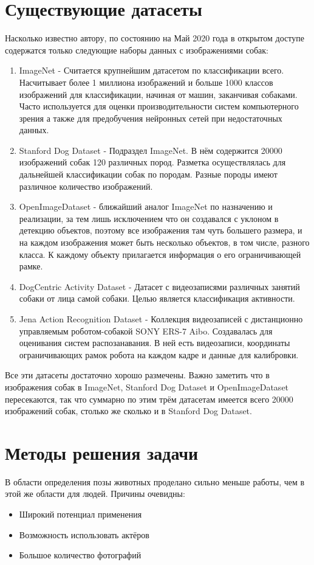 \section{Существующие датасеты} \label{sect1_1}
Насколько известно автору, по состоянию на Май 2020 года в открытом доступе содержатся только следующие наборы данных с изображениями собак:
\begin{enumerate}
  \item ImageNet \cite{imagenet} - Считается крупнейшим датасетом по классификации всего. Насчитывает более 1 миллиона изображений и больше 1000 классов изображений для классификации, начиная от машин, заканчивая собаками. Часто используется для оценки производительности систем компьютерного зрения а также для предобучения нейронных сетей при недостаточных данных.
  \item Stanford Dog Dataset \cite{KhoslaYaoJayadevaprakashFeiFei_FGVC2011} - Подраздел ImageNet. В нём содержится 20000 изображений собак 120 различных пород. Разметка осуществлялась для дальнейшей классификации собак по породам. Разные породы имеют различное количество изображений.
  \item OpenImageDataset \cite{openimages} - ближайший аналог ImageNet по назначению и реализации, за тем лишь исключением что он создавался с уклоном в детекцию объектов, поэтому все изображения там чуть большего размера, и на каждом изображения может быть несколько объектов, в том числе, разного класса. К каждому объекту прилагается информация о его ограничивающей рамке.
  \item DogCentric Activity Dataset \cite{yumi2014first} - Датасет с видеозаписями различных занятий собаки от лица самой собаки. Целью является классификация активности.
  \item Jena Action Recognition Dataset \cite{jena} - Коллекция видеозаписей с дистанционно управляемым роботом-собакой SONY ERS-7 Aibo. Создавалась для оценивания систем распозанавания. В ней есть видеозаписи, координаты ограничивающих рамок робота на каждом кадре и данные для калибровки.
\end{enumerate}
Все эти датасеты достаточно хорошо размечены. Важно заметить что в изображения собак в ImageNet, Stanford Dog Dataset и OpenImageDataset пересекаются, так что суммарно по этим трём датасетам имеется всего 20000 изображений собак, столько же сколько и в Stanford Dog Dataset.

\section{Методы решения задачи} \label{sect1_2}
В области определения позы животных проделано сильно меньше работы, чем в этой же области для людей. Причины очевидны:
\begin{itemize}
    \item Широкий потенциал применения
    \item Возможность использовать актёров
    \item Большое количество фотографий
\end{itemize}
